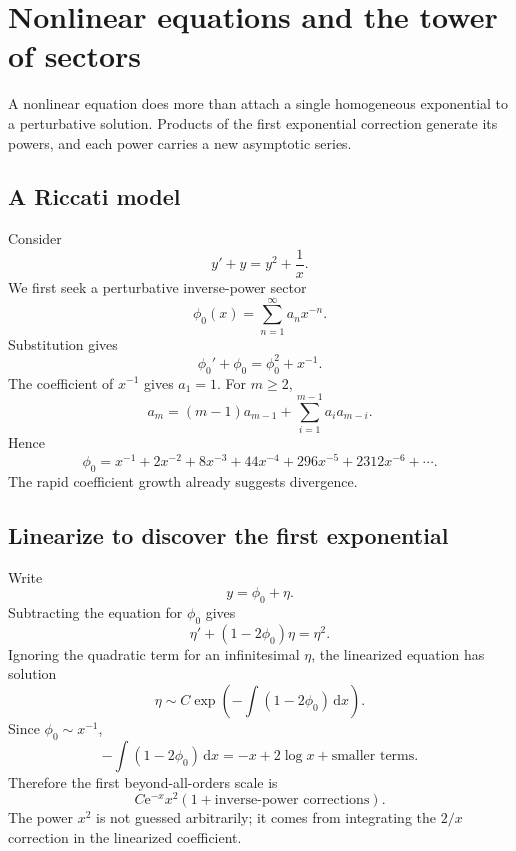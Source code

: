 \documentclass[11pt,openany]{book}
\theoremstyle{definition}
\theoremstyle{plain}
\theoremstyle{remark}
\newcommand{\dd}{\,\mathrm{d}}
\newcommand{\e}{\mathrm{e}}
\newcommand{\asym}{\sim}
\begin{document}
\chapter{Nonlinear equations and the tower of sectors}\label{ch:nonlinear-odes}

A nonlinear equation does more than attach a single homogeneous exponential to a perturbative solution. Products of the first exponential correction generate its powers, and each power carries a new asymptotic series.

\section{A Riccati model}

Consider
\begin{equation}\label{eq:Riccati-model}
 y'+y=y^2+\frac1x.
\end{equation}
We first seek a perturbative inverse-power sector
\begin{equation}\label{eq:phi0}
 \phi_0(x)=\sum_{n=1}^{\infty}a_nx^{-n}.
\end{equation}
Substitution gives
\[
 \phi_0'+\phi_0=\phi_0^2+x^{-1}.
\]
The coefficient of $x^{-1}$ gives $a_1=1$. For $m\ge2$,
\begin{equation}\label{eq:phi0-recurrence}
 a_m=(m-1)a_{m-1}+\sum_{i=1}^{m-1}a_i a_{m-i}.
\end{equation}
Hence
\begin{equation}\label{eq:phi0-coeffs}
 \phi_0=x^{-1}+2x^{-2}+8x^{-3}+44x^{-4}
 +296x^{-5}+2312x^{-6}+\cdots.
\end{equation}
The rapid coefficient growth already suggests divergence.

\section{Linearize to discover the first exponential}

Write
\[
 y=\phi_0+\eta.
\]
Subtracting the equation for $\phi_0$ gives
\begin{equation}\label{eq:Riccati-eta}
 \eta'+(1-2\phi_0)\eta=\eta^2.
\end{equation}
Ignoring the quadratic term for an infinitesimal $\eta$, the linearized equation has solution
\[
 \eta\asym C\exp\left(-\int(1-2\phi_0)\dd x\right).
\]
Since $\phi_0\asym x^{-1}$,
\[
 -\int(1-2\phi_0)\dd x=-x+2\log x+\text{smaller terms}.
\]
Therefore the first beyond-all-orders scale is
\begin{equation}\label{eq:Riccati-first-scale}
 C\e^{-x}x^2\left(1+\text{inverse-power corrections}\right).
\end{equation}
The power $x^2$ is not guessed arbitrarily; it comes from integrating the $2/x$ correction in the linearized coefficient.
\end{document}
